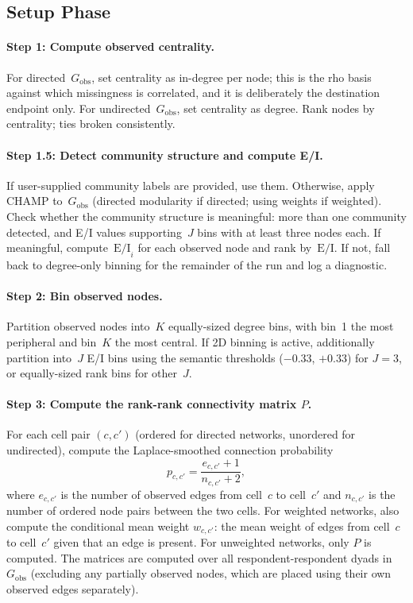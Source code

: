 \documentclass[11pt]{article}
\newcommand{\Gobs}{G_{\text{obs}}}
\newcommand{\EI}{\text{E/I}}
\newcommand{\Pmat}{P}
\begin{document}
\subsection{Setup Phase}

\paragraph{Step 1: Compute observed centrality.}
For directed~$\Gobs$, set centrality as in-degree per node; this is the rho basis against which missingness is correlated, and it is deliberately the destination endpoint only. For undirected~$\Gobs$, set centrality as degree. Rank nodes by centrality; ties broken consistently.

\paragraph{Step 1.5: Detect community structure and compute E/I.}
If user-supplied community labels are provided, use them. Otherwise, apply CHAMP to~$\Gobs$ (directed modularity if directed; using weights if weighted). Check whether the community structure is meaningful: more than one community detected, and E/I values supporting~$J$ bins with at least three nodes each. If meaningful, compute~$\EI_i$ for each observed node and rank by~$\EI$. If not, fall back to degree-only binning for the remainder of the run and log a diagnostic.

\paragraph{Step 2: Bin observed nodes.}
Partition observed nodes into~$K$ equally-sized degree bins, with bin~1 the most peripheral and bin~$K$ the most central. If 2D binning is active, additionally partition into~$J$ E/I bins using the semantic thresholds ($-0.33$, $+0.33$) for $J = 3$, or equally-sized rank bins for other~$J$.

\paragraph{Step 3: Compute the rank-rank connectivity matrix $\Pmat$.}
For each cell pair $(c, c')$ (ordered for directed networks, unordered for undirected), compute the Laplace-smoothed connection probability
\[
p_{c, c'} = \frac{e_{c, c'} + 1}{n_{c, c'} + 2},
\]
where $e_{c, c'}$ is the number of observed edges from cell~$c$ to cell~$c'$ and $n_{c, c'}$ is the number of ordered node pairs between the two cells. For weighted networks, also compute the conditional mean weight $w_{c, c'}$: the mean weight of edges from cell~$c$ to cell~$c'$ given that an edge is present. For unweighted networks, only $\Pmat$ is computed. The matrices are computed over all respondent-respondent dyads in~$\Gobs$ (excluding any partially observed nodes, which are placed using their own observed edges separately).
\end{document}
